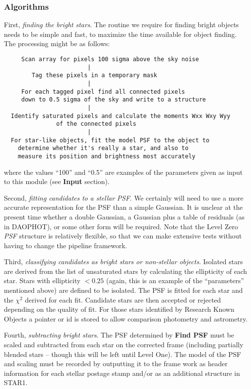 \subsubsection {Algorithms}

First, {\it finding the bright stars}.
The routine we require for finding bright objects 
needs to be simple and fast, to maximize the
time available for object finding. The processing might be as follows:

\begin{verbatim}
     Scan array for pixels 100 sigma above the sky noise
                        |
        Tag these pixels in a temporary mask
                        |
     For each tagged pixel find all connected pixels
     down to 0.5 sigma of the sky and write to a structure
                        |
  Identify saturated pixels and calculate the moments Wxx Wxy Wyy
               of the connected pixels
                        |
  For star-like objects, fit the model PSF to the object to 
    determine whether it's really a star, and also to
    measure its position and brightness most accurately
\end{verbatim}

where the values ``100'' and ``0.5'' are examples of the
parameters given as input to this module (see {\bf Input} section).


Second, {\it fitting candidates to a stellar PSF}.
We certainly will need to use a more accurate representation 
for the PSF than a simple Gaussian.  It is unclear at the present
time whether a double Gaussian, a Gaussian plus a table of
residuals (as in DAOPHOT), or some other form will be required.  Note that 
the Level Zero {\it PSF} structure is relatively flexible, so
that we can make extensive tests without having to change
the pipeline framework.

Third, {\it classifying candidates as bright stars or non-stellar objects}.
Isolated stars are derived from the list of unsaturated stars by calculating
the ellipticity of each star. Stars with ellipticity $<0.25$ 
(again, this is an example of the ``parameters'' mentioned above)
are defined to
be isolated. The PSF is fitted for each star and 
the $\chi^2$ derived for each fit. 
Candidate stars are then accepted or rejected depending on
the quality of fit. For those stars identified by Research Known
Objects a pointer or id is stored to allow comparison photometry and 
astrometry.

Fourth, {\it subtracting bright stars}. The PSF determined by {\bf
Find PSF}
must be scaled and subtracted from each star on the corrected frame
(including partially blended stars -- though this will be left until
Level One). The model of the PSF and scaling must be recorded 
by outputting it to the frame work as header information for each
stellar postage stamp and/or as an additional structure in STAR1. 
